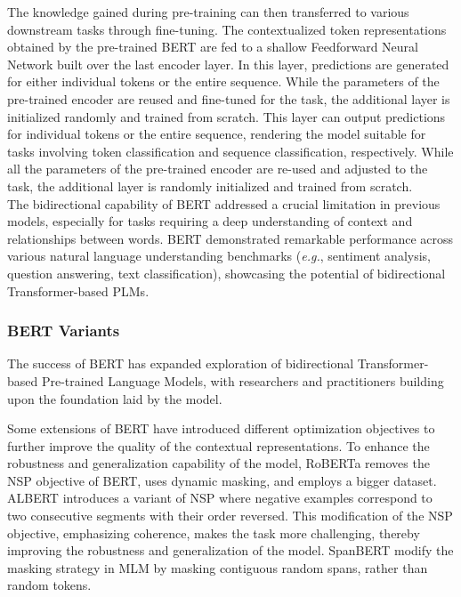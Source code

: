 The knowledge gained during pre-training can then transferred to various downstream tasks through fine-tuning. The contextualized token representations obtained by the pre-trained \ac{BERT} are fed to a shallow Feedforward Neural Network built over the last encoder layer. In this layer, predictions are generated for either individual tokens or the entire sequence. While the parameters of the pre-trained encoder are reused and fine-tuned for the task, the additional layer is initialized randomly and trained from scratch. This layer can output predictions for individual tokens or the entire sequence, rendering the model suitable for tasks involving token classification and sequence classification, respectively. While all the parameters of the pre-trained encoder are re-used and adjusted to the task, the additional layer is randomly initialized and trained from scratch. \\

The bidirectional capability of \ac{BERT} addressed a crucial limitation in previous models, especially for tasks requiring a deep understanding of context and relationships between words. \ac{BERT} demonstrated remarkable performance across various natural language understanding benchmarks (\textit{e.g.}, sentiment analysis, question answering, text classification), showcasing the potential of bidirectional Transformer-based PLMs.
 
\subsubsection{BERT Variants}

The success of \ac{BERT} has expanded exploration of bidirectional Transformer-based Pre-trained Language Models, with researchers and practitioners building upon the foundation laid by the model. 

Some extensions of \ac{BERT} have introduced different optimization objectives to further improve the quality of the contextual representations. To enhance the robustness and generalization capability of the model, \ac{RoBERTa} \citep{liu2019roberta} removes the \ac{NSP} objective of \ac{BERT}, uses dynamic masking, and employs a bigger dataset. \ac{ALBERT} \citep{lan2019albert} introduces a variant of \ac{NSP} where negative examples correspond to two consecutive segments with their order reversed. This modification of the \ac{NSP} objective, emphasizing coherence, makes the task more challenging, thereby improving the robustness and generalization of the model. SpanBERT \citep{joshi2020spanbert} modify the masking strategy in \ac{MLM} by masking contiguous random spans, rather than random tokens. 


